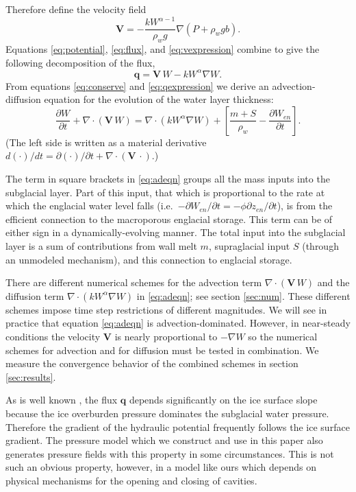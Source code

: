 \documentclass[11pt,final]{amsart}%
\newcommand\bV{\mathbf{V}}
\newcommand\bq{\mathbf{q}}
\newcommand{\Div}{\nabla\cdot}
\newcommand{\grad}{\nabla}
\begin{document}
Therefore define the velocity field
\begin{equation} \label{eq:vexpression}
  \bV = - \frac{k W^{\alpha-1}}{\rho_w g} \grad \left(P + \rho_w g b\right).
\end{equation}
Equations \eqref{eq:potential}, \eqref{eq:flux}, and \eqref{eq:vexpression} combine to give the following decomposition of the flux,
\begin{equation} \label{eq:qexpression}
  \bq = \bV\, W - k W^\alpha \grad W.
\end{equation}
From equations \eqref{eq:conserve} and \eqref{eq:qexpression} we derive an advection-diffusion equation \citep{HundsdorferVerwer2010} for the evolution of the water layer thickness:
\begin{equation} \label{eq:adeqn}
  \frac{\partial W}{\partial t} + \Div\left(\bV\, W\right) = \Div \left(k W^\alpha \grad W\right) + \left[\frac{m+S}{\rho_w} - \frac{\partial W_{en}}{\partial t}\right].
\end{equation}
(The left side is written as a material derivative $d(\cdot)/dt = \partial(\cdot)/\partial t + \Div\left(\bV\,\cdot\right)$.)

The term in square brackets in \eqref{eq:adeqn} groups all the mass inputs into the subglacial layer.  Part of this input, that which is proportional to the rate at which the englacial water level falls (i.e.~$-\partial W_{en}/\partial t = - \phi \partial z_{en}/\partial t$), is from the efficient connection to the macroporous englacial storage.  This term can be of either sign in a dynamically-evolving manner.  The total input into the subglacial layer is a sum of contributions from wall melt $m$, supraglacial input $S$ (through an unmodeled mechanism), and this connection to englacial storage.

There are different numerical schemes for the advection term $\Div\left(\bV\, W\right)$ and the diffusion term $\Div \left(k W^\alpha \grad W\right)$ in \eqref{eq:adeqn}; see section \ref{sec:num}.  These different schemes impose time step restrictions of different magnitudes.  We will see in practice that equation \eqref{eq:adeqn} is advection-dominated.  However, in near-steady conditions the velocity $\bV$ is nearly proportional to $-\grad W$ so the numerical schemes for advection and for diffusion must be tested in combination.  We measure the convergence behavior of the combined schemes in section \ref{sec:results}.

As is well known \citep{Clarke05}, the flux $\bq$ depends significantly on the ice surface slope because the ice overburden pressure dominates the subglacial water pressure.  Therefore the gradient of the hydraulic potential frequently follows the ice surface gradient.  The pressure model which we construct and use in this paper also generates pressure fields with this property in some circumstances.  This is not such an obvious property, however, in a model like ours which depends on physical mechanisms for the opening and closing of cavities.
\end{document}

